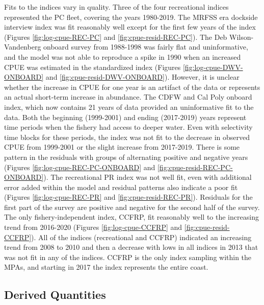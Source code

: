 \documentclass[
  english,
  a4paper,
]{article}
\begin{document}
Fits to the indices vary in quality. Three of the four recreational indices represented the PC fleet, covering the years 1980-2019.
The MRFSS era dockside interview index was fit reasonably well except for the first few years of the index (Figures \ref{fig:log-cpue-REC-PC} and \ref{fig:cpue-resid-REC-PC}). The Deb Wilson-Vandenberg onboard survey from 1988-1998 was fairly flat and uninformative, and the model was not able to reproduce a spike in 1990 when an increased CPUE was estimated in the standardized index (Figures \ref{fig:log-cpue-DWV-ONBOARD} and \ref{fig:cpue-resid-DWV-ONBOARD}). However, it is unclear whether the increase in CPUE for one year is an artifact of the data or represents an actual short-term increase in abundance. The CDFW and Cal Poly onboard index, which now contains 21 years of data provided an uninformative fit to the data. Both the beginning (1999-2001) and ending (2017-2019) years represent time periods when the fishery had access to deeper water. Even with selectivity time blocks for these periods, the index was not fit to the decrease in observed CPUE from 1999-2001 or the slight increase from 2017-2019. There is some pattern in the residuals with groups of alternating positive and negative years (Figures \ref{fig:log-cpue-REC-PC-ONBOARD} and \ref{fig:cpue-resid-REC-PC-ONBOARD}).
The recreational PR index was not well fit, even with additional error added within the model and residual patterns
also indicate a poor fit (Figures \ref{fig:log-cpue-REC-PR} and \ref{fig:cpue-resid-REC-PR}). Residuals for the
first part of the survey are positive and negative for the second half of the survey. The only fishery-independent
index, CCFRP, fit reasonably well to the increasing trend from 2016-2020 (Figures \ref{fig:log-cpue-CCFRP} and \ref{fig:cpue-resid-CCFRP}). All of the indices (recreational and CCFRP) indicated an increasing trend from
2008 to 2010 and then a decrease with lows in all indices in 2013 that was not fit in any of the indices. CCFRP
is the only index sampling within the MPAs, and starting in 2017 the index represents the entire coast.

\hypertarget{derived-quantities}{%
\subsection{Derived Quantities}\label{derived-quantities}}
\end{document}
